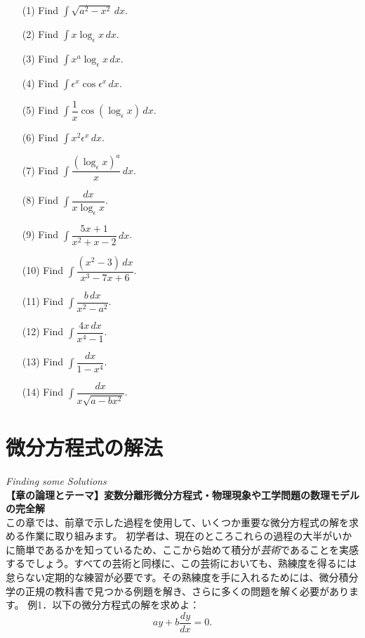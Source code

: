 \documentclass[a4paper,11pt,openany]{ltjsbook}
\begin{document}
\begin{enumerate}
\item[(1)] Find $\displaystyle \int \sqrt {a^2 - x^2}\, dx$.
\item[(2)] Find $\displaystyle \int x \log_\epsilon x\, dx$.

\item[(3)] Find $\displaystyle \int x^a \log_\epsilon x\, dx$.
\item[(4)] Find $\displaystyle \int \epsilon^x \cos \epsilon^x\, dx$.

\item[(5)] Find $\displaystyle \int \dfrac{1}{x} \cos (\log_\epsilon x)\, dx$.
\item[(6)] Find $\displaystyle \int x^2 \epsilon^x\, dx$.

\item[(7)] Find $\displaystyle \int \dfrac{(\log_\epsilon x)^a}{x}\, dx$.
\item[(8)] Find $\displaystyle \int \dfrac{dx}{x \log_\epsilon x}$.

\item[(9)] Find $\displaystyle \int \dfrac{5x+1}{x^2 +x-2}\, dx$.
\item[(10)] Find $\displaystyle \int \dfrac{(x^2 -3)\, dx}{x^3 - 7x+6}$.

\item[(11)] Find $\displaystyle \int \dfrac{b\, dx}{x^2 -a^2}$.
\item[(12)] Find $\displaystyle \int \dfrac{4x\, dx}{x^4 -1}$.

\item[(13)] Find $\displaystyle \int \dfrac{dx}{1-x^4}$.
\item[(14)] Find $\displaystyle \int \dfrac{dx}{x \sqrt {a-bx^2}}$.

\end{enumerate}



\chapter{微分方程式の解法}
\noindent\textit{\large Finding some Solutions}\\[2mm]
\noindent\textbf{\small 【章の論理とテーマ】変数分離形微分方程式・物理現象や工学問題の数理モデルの完全解}\\[4mm]
この章では、前章で示した過程を使用して、いくつか重要な微分方程式の解を求める作業に取り組みます。
初学者は、現在のところこれらの過程の大半がいかに簡単であるかを知っているため、ここから始めて積分が\emph{芸術}であることを実感するでしょう。すべての芸術と同様に、この芸術においても、熟練度を得るには怠らない定期的な練習が必要です。その熟練度を手に入れるためには、微分積分学の正規の教科書で見つかる例題を解き、さらに多くの問題を解く必要があります。
例1．以下の微分方程式の解を求めよ：
\[
ay + b \frac{dy}{dx} = 0.
\]
\end{document}
